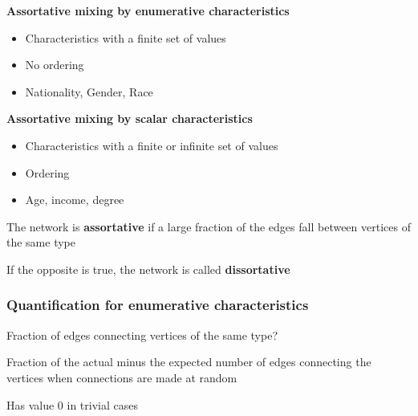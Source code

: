 \documentclass{beamer}
\begin{document}
\begin{frame}
    \centering
        \vspace{1em}
    {\bf Assortative mixing by enumerative characteristics}
        \begin{itemize}
        \setlength\itemsep{1em}
            \item{Characteristics with a finite set of values} 
            \item{No ordering} 
            \item{Nationality, Gender, Race} 
        \end{itemize}
        \vspace{1em}
    {\bf Assortative mixing by scalar characteristics}
        \begin{itemize}
        \setlength\itemsep{1em}
            \item{Characteristics with a finite or infinite set of values}
            \item{Ordering}
            \item{Age, income, degree}
        \end{itemize}
        \pause
        \vspace{1em}
        The network is {\bf assortative} if a large fraction of the edges fall between vertices of the same type

        \vspace{1em}
        If the opposite is true, the network is called {\bf dissortative}
\end{frame}
\begin{frame}
    \frametitle{Quantification for enumerative characteristics}
        
    \begin{itemize}
    \setlength\itemsep{2em}
        \item{Fraction of edges connecting vertices of the same type?}
        
        \pause
        \item{Fraction of the actual minus the expected number of edges connecting the vertices when connections are made at random\\

        \pause
        \item{Has value $0$ in trivial cases}
}
    \end{itemize}
\end{frame}
\end{document}
